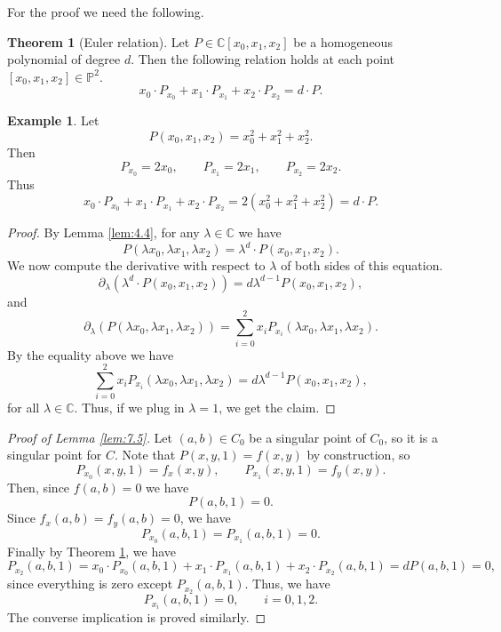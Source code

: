 \documentclass{article}
\newcommand{\C}{\mathbb{C}}
\renewcommand{\P}{\mathbb{P}}
\newcommand{\rb}[1]{\left( #1 \right)}
\renewcommand{\sb}[1]{\left[ #1 \right]}
\theoremstyle{definition}\newtheorem{definition}{Definition}[section]
\theoremstyle{definition}\newtheorem{notation}[definition]{Notation}
\theoremstyle{definition}\newtheorem{remark}[definition]{Remark}
\theoremstyle{definition}\newtheorem{example1}[definition]{Example}
\theoremstyle{definition}\newtheorem{fact}{Fact}
\theoremstyle{definition}\newtheorem{exercise}{Exercise}
\theoremstyle{definition}\newtheorem*{example2}{Example}
\newtheorem{theorem}[definition]{Theorem}
\begin{document}
For the proof we need the following.

\begin{theorem}[Euler relation]
\label{thm:7.6}
Let $ P \in \C\sb{x_0, x_1, x_2} $ be a homogeneous polynomial of degree $ d $. Then the following relation holds at each point $ \sb{x_0, x_1, x_2} \in \P^2 $.
$$ x_0 \cdot P_{x_0} + x_1 \cdot P_{x_1} + x_2 \cdot P_{x_2} = d \cdot P. $$
\end{theorem}

\begin{example2}
Let
$$ P\rb{x_0, x_1, x_2} = x_0^2 + x_1^2 + x_2^2. $$
Then
$$ P_{x_0} = 2x_0, \qquad P_{x_1} = 2x_1, \qquad P_{x_2} = 2x_2. $$
Thus
$$ x_0 \cdot P_{x_0} + x_1 \cdot P_{x_1} + x_2 \cdot P_{x_2} = 2\rb{x_0^2 + x_1^2 + x_2^2} = d \cdot P. $$
\end{example2}

\begin{proof}
By Lemma \ref{lem:4.4}, for any $ \lambda \in \C $ we have
$$ P\rb{\lambda x_0, \lambda x_1, \lambda x_2} = \lambda^d \cdot P\rb{x_0, x_1, x_2}. $$
We now compute the derivative with respect to $ \lambda $ of both sides of this equation.
$$ \partial_\lambda\rb{\lambda^d \cdot P\rb{x_0, x_1, x_2}} = d\lambda^{d - 1}P\rb{x_0, x_1, x_2}, $$
and
$$ \partial_\lambda\rb{P\rb{\lambda x_0, \lambda x_1, \lambda x_2}} = \sum_{i = 0}^2 x_iP_{x_i}\rb{\lambda x_0, \lambda x_1, \lambda x_2}. $$
By the equality above we have
$$ \sum_{i = 0}^2 x_iP_{x_i}\rb{\lambda x_0, \lambda x_1, \lambda x_2} = d\lambda^{d - 1}P\rb{x_0, x_1, x_2}, $$
for all $ \lambda \in \C $. Thus, if we plug in $ \lambda = 1 $, we get the claim.
\end{proof}

\begin{proof}[Proof of Lemma \ref{lem:7.5}]
Let $ \rb{a, b} \in C_0 $ be a singular point of $ C_0 $, so it is a singular point for $ C $. Note that $ P\rb{x, y, 1} = f\rb{x, y} $ by construction, so
$$ P_{x_0}\rb{x, y, 1} = f_x\rb{x, y}, \qquad P_{x_1}\rb{x, y, 1} = f_y\rb{x, y}. $$
Then, since $ f\rb{a, b} = 0 $ we have
$$ P\rb{a, b, 1} = 0. $$
Since $ f_x\rb{a, b} = f_y\rb{a, b} = 0 $, we have
$$ P_{x_0}\rb{a, b, 1} = P_{x_1}\rb{a, b, 1} = 0. $$
Finally by Theorem \ref{thm:7.6}, we have
$$ P_{x_2}\rb{a, b, 1} = x_0 \cdot P_{x_0}\rb{a, b, 1} + x_1 \cdot P_{x_1}\rb{a, b, 1} + x_2 \cdot P_{x_2}\rb{a, b, 1} = dP\rb{a, b, 1} = 0, $$
since everything is zero except $ P_{x_2}\rb{a, b, 1} $. Thus, we have
$$ P_{x_i}\rb{a, b, 1} = 0, \qquad i = 0, 1, 2. $$
The converse implication is proved similarly.
\end{proof}
\end{document}

